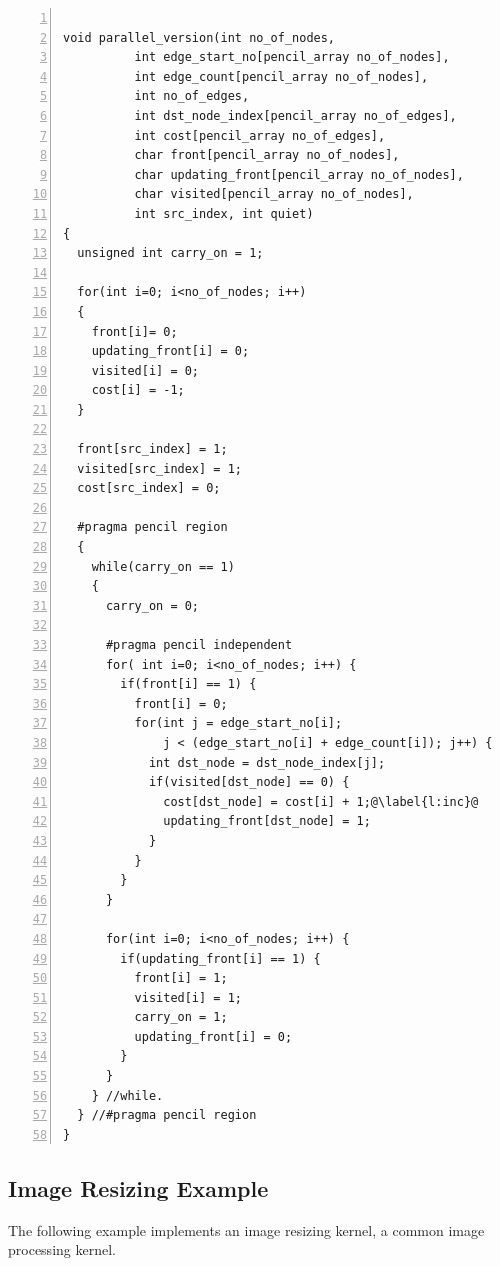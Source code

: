 \documentclass{carp}
\begin{document}
\begin{lstlisting}[language=pencil,escapechar=@, numbers=left,numberstyle={\tiny\tt},numbersep=5pt]

void parallel_version(int no_of_nodes,
          int edge_start_no[pencil_array no_of_nodes],
          int edge_count[pencil_array no_of_nodes],
          int no_of_edges,
          int dst_node_index[pencil_array no_of_edges],
          int cost[pencil_array no_of_edges],
          char front[pencil_array no_of_nodes],
          char updating_front[pencil_array no_of_nodes],
          char visited[pencil_array no_of_nodes],
          int src_index, int quiet)
{
  unsigned int carry_on = 1;

  for(int i=0; i<no_of_nodes; i++)
  {
    front[i]= 0;
    updating_front[i] = 0;
    visited[i] = 0;
    cost[i] = -1;
  }

  front[src_index] = 1;
  visited[src_index] = 1;
  cost[src_index] = 0;

  #pragma pencil region
  {
    while(carry_on == 1)
    {
      carry_on = 0;

      #pragma pencil independent
      for( int i=0; i<no_of_nodes; i++) {
        if(front[i] == 1) {
          front[i] = 0; 
          for(int j = edge_start_no[i]; 
              j < (edge_start_no[i] + edge_count[i]); j++) {
            int dst_node = dst_node_index[j];
            if(visited[dst_node] == 0) {
              cost[dst_node] = cost[i] + 1;@\label{l:inc}@
              updating_front[dst_node] = 1;
            }
          }
        }
      }

      for(int i=0; i<no_of_nodes; i++) {
        if(updating_front[i] == 1) {
          front[i] = 1;
          visited[i] = 1;
          carry_on = 1;
          updating_front[i] = 0;
        }
      }  
    } //while.
  } //#pragma pencil region
}
\end{lstlisting}

\subsection{Image Resizing Example}

The following example implements an image resizing kernel,
a common image processing kernel.
\end{document}
